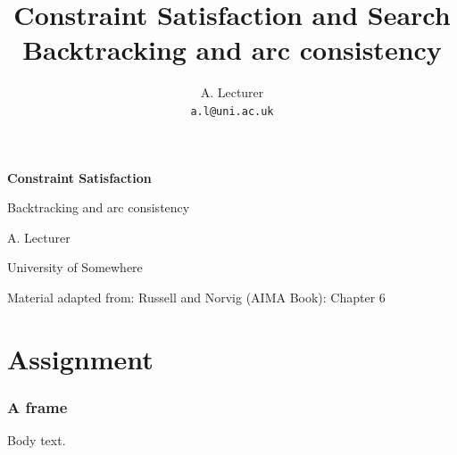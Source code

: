 \documentclass{ltx-talk}
\author[A. Lecturer]{A. Lecturer\\ \texttt{a.l@uni.ac.uk}}
\institute[Somewhere]{University of Somewhere}
\title[CSP]{Constraint Satisfaction and Search\\\large{Backtracking and arc consistency}}
\date{}
\begin{document}
\begin{frame}[vertical-alignment=center]
\begin{center}
{\Huge\bfseries Constraint Satisfaction}\par
\vspace{0.5em}
{\Large Backtracking and arc consistency}\par
\vspace{2.5em}
{\large A. Lecturer}\par
\vspace{0.4em}
University of Somewhere\par
\vspace{2.5em}
{\small Material adapted from: Russell and Norvig (AIMA Book): Chapter 6}
\end{center}
\end{frame}
\section{Assignment}
\begin{frame}
\frametitle{A frame}
Body text.
\end{frame}
\end{document}
